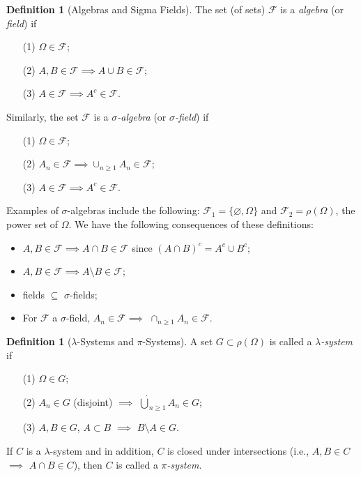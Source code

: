 \documentclass[12pt,reqno]{article}
\renewcommand{\emph}[1]{\textit{#1}}
\theoremstyle{plain}
\theoremstyle{definition}
\newtheorem{definition}[theorem]{Definition}
\begin{document}
\begin{definition}[Algebras and Sigma Fields]
The set (of sets) $\mathcal{F}$ is a \emph{algebra} (or \emph{field}) if 
\begin{itemize} 

\item[(1)] $\Omega \in \mathcal{F}$; 
\item[(2)] $A,B \in \mathcal{F} \implies A \cup B \in \mathcal{F}$; 
\item[(3)] $A \in \mathcal{F} \implies A^{c} \in \mathcal{F}$. 

\end{itemize} 
Similarly, the set 
$\mathcal{F}$ is a \emph{$\sigma$-algebra} (or \emph{$\sigma$-field}) if 
\begin{itemize} 

\item[(1)] $\Omega \in \mathcal{F}$; 
\item[(2)] $A_n \in \mathcal{F} 
            \implies \cup_{n \geq 1} A_n \in \mathcal{F}$; 
\item[(3)] $A \in \mathcal{F} \implies A^{c} \in \mathcal{F}$. 

\end{itemize} 
\end{definition} 

Examples of $\sigma$-algebras include the following: 
$\mathcal{F}_1 = \{\varnothing, \Omega\}$ and 
$\mathcal{F}_2 = \rho(\Omega)$, the power set of $\Omega$. 
We have the following consequences of these definitions:
\begin{itemize} 

\item $A,B \in \mathcal{F} \implies A \cap B \in \mathcal{F}$ since 
      $(A \cap B)^c = A^c \cup B^c$; 
\item $A,B \in \mathcal{F} \implies A \setminus B \in \mathcal{F}$; 
\item fields $\subseteq$ $\sigma$-fields; 
\item For $\mathcal{F}$ a $\sigma$-field, $A_n \in \mathcal{F} \implies$ 
      $\cap_{n \geq 1} A_n \in \mathcal{F}$. 

\end{itemize} 

\begin{definition}[$\lambda$-Systems and $\pi$-Systems]
A set $G \subset \rho(\Omega)$ is called a \emph{$\lambda$-system} if 
\begin{itemize} 

\item[(1)] $\Omega \in G$; 
\item[(2)] $A_n \in G$ (disjoint) $\implies$ 
     $\dot{\bigcup}_{n \geq 1} A_n \in G$; 
\item[(3)] $A,B \in G$, $A \subset B$ $\implies$ $B \setminus A \in G$. 

\end{itemize} 
If $C$ is a $\lambda$-system and in addition, 
$C$ is closed under intersections 
(i.e., $A,B \in C$ $\implies$ $A \cap B \in C$), then $C$ is called a 
\emph{$\pi$-system}. 
\end{definition} 
\end{document}
